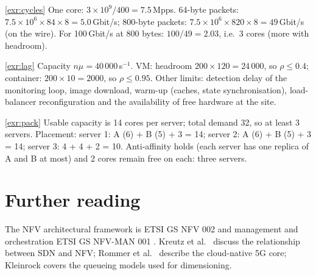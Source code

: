 \documentclass[11pt,a4paper]{article}
\begin{document}
\begin{solutionbox}{\ref{exr:cycles}}
One core: $3\times10^9/400 = 7.5$\,Mpps. 64-byte packets: $7.5\times10^6\times84\times8 = 5.0$\,Gbit/s; 800-byte packets:
$7.5\times10^6\times820\times8 = 49$\,Gbit/s (on the wire). For 100\,Gbit/s at 800 bytes: $100/49 = 2.03$, i.e.\ 3 cores
(more with headroom).
\end{solutionbox}

\begin{solutionbox}{\ref{exr:lag}}
Capacity $n\mu = 40\,000$\,s$^{-1}$. VM: headroom $200\times120 = 24\,000$, so $\rho \le 0.4$; container: $200\times10 = 2000$, so
$\rho \le 0.95$. Other limits: detection delay of the monitoring loop, image download, warm-up (caches, state
synchronisation), load-balancer reconfiguration and the availability of free hardware at the site.
\end{solutionbox}

\begin{solutionbox}{\ref{exr:pack}}
Usable capacity is 14 cores per server; total demand 32, so at least 3 servers. Placement: server 1: A (6) + B (5) + 3 = 14;
server 2: A (6) + B (5) + 3 = 14; server 3: 4 + 4 + 2 = 10. Anti-affinity holds (each server has one replica of A and B at most)
and 2 cores remain free on each: three servers.
\end{solutionbox}

\section{Further reading}
The NFV architectural framework is ETSI GS NFV 002 \cite{etsinfv002} and management and orchestration ETSI GS NFV-MAN 001
\cite{etsinfvman001}. Kreutz et al.\ \cite{kreutz2015sdn} discuss the relationship between SDN and NFV; Rommer et al.\
\cite{rommer2020core} describe the cloud-native 5G core; Kleinrock \cite{kleinrock1975queueing} covers the queueing models used
for dimensioning.

\printbibliography[heading=subbibliography,title={\ACNstrRefs}]
\end{document}
